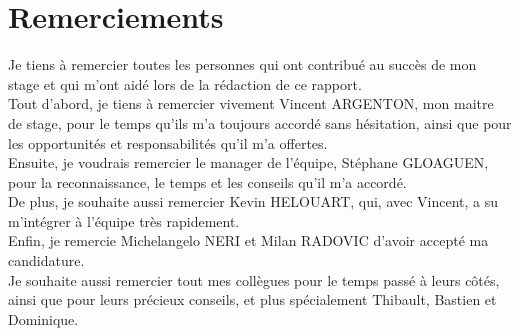 \chapter*{Remerciements} %

Je tiens à remercier toutes les personnes qui ont contribué au succès de mon stage et qui m'ont aidé lors de la rédaction de ce rapport.  \\

Tout d'abord, je tiens à remercier vivement Vincent ARGENTON, mon maitre de stage, pour le temps qu'ils m'a toujours accordé sans hésitation, ainsi que pour les opportunités et responsabilités qu'il m'a offertes. \\

Ensuite, je voudrais remercier le manager de l'équipe, Stéphane GLOAGUEN, pour la reconnaissance, le temps et les conseils qu'il m'a accordé. \\
	
De plus, je souhaite aussi remercier Kevin HELOUART, qui, avec Vincent, a su m'intégrer à l'équipe très rapidement.  \\

Enfin, je remercie Michelangelo NERI et Milan RADOVIC d'avoir accepté ma candidature.\\

Je souhaite aussi remercier tout mes collègues pour le temps passé à leurs côtés, ainsi que pour leurs précieux conseils, et plus spécialement Thibault, Bastien et Dominique.
